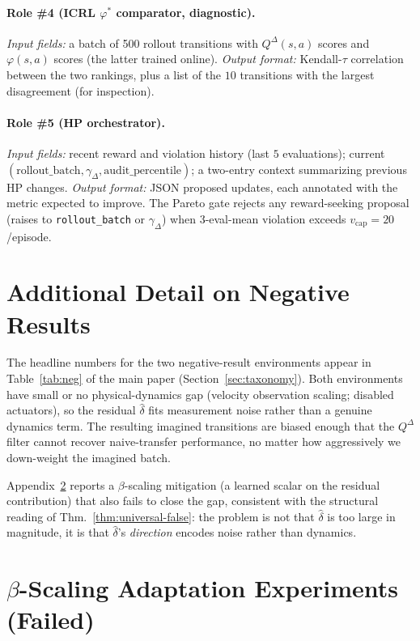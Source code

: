 \documentclass{article}
\theoremstyle{definition}
\newcommand{\QD}{Q^{\Delta}}
\begin{document}
\paragraph{Role \#4 (ICRL $\varphi^*$ comparator, diagnostic).}
\emph{Input fields:} a batch of 500 rollout transitions with
$\QD(s,a)$ scores and $\varphi(s,a)$ scores (the latter trained online).
\emph{Output format:} Kendall-$\tau$ correlation between the two
rankings, plus a list of the $10$ transitions with the largest
disagreement (for inspection).

\paragraph{Role \#5 (HP orchestrator).}
\emph{Input fields:} recent reward and violation history (last $5$
evaluations); current $(\text{rollout\_batch},\gamma_\Delta,\text{audit\_percentile})$;
a two-entry context summarizing previous HP changes.
\emph{Output format:} JSON proposed updates, each annotated with the
metric expected to improve.  The Pareto gate rejects any
reward-seeking proposal (raises to \texttt{rollout\_batch} or
$\gamma_\Delta$) when 3-eval-mean violation exceeds
$v_\mathrm{cap}=20$/episode.

\section{Additional Detail on Negative Results}
\label{app:neg}

The headline numbers for the two negative-result environments appear
in Table~\ref{tab:neg} of the main paper (Section~\ref{sec:taxonomy}).
Both environments have small or no physical-dynamics gap (velocity
observation scaling; disabled actuators), so the residual $\hat\delta$
fits measurement noise rather than a genuine dynamics term.  The
resulting imagined transitions are biased enough that the $\QD$
filter cannot recover naive-transfer performance, no matter how
aggressively we down-weight the imagined batch.

Appendix~\ref{app:beta} reports a $\beta$-scaling mitigation (a learned
scalar on the residual contribution) that also fails to close the gap,
consistent with the structural reading of
Thm.~\ref{thm:universal-false}: the problem is not that $\hat\delta$
is too large in magnitude, it is that $\hat\delta$'s \emph{direction}
encodes noise rather than dynamics.

\section{$\beta$-Scaling Adaptation Experiments (Failed)}
\label{app:beta}
\end{document}
